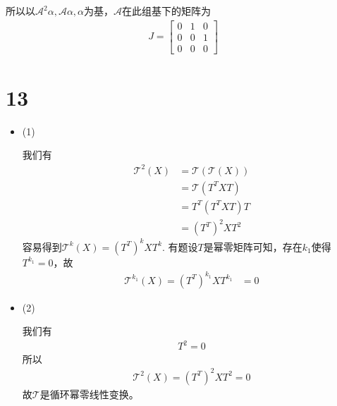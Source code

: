 \documentclass{article}
\begin{document}
所以以$\mathscr{A}^2 \alpha, \mathscr{A} \alpha, \alpha$为基，$\mathscr{A}$在此组基下的矩阵为
\begin{align*}
  J = \begin{bmatrix}
        0 & 1 & 0 \\
        0 & 0 & 1 \\
        0 & 0 & 0
      \end{bmatrix}
\end{align*}

\section*{13}

\begin{itemize}
  \item (1)

        我们有
        \begin{align*}
          \mathscr{T}^2(X)
           & = \mathscr{T}(\mathscr{T}(X)) \\
           & = \mathscr{T}(T^T X T)        \\
           & = T^T (T^T X T) T             \\
           & = (T^T)^2 X T^2
        \end{align*}
        容易得到$\mathscr{T}^k(X) = (T^T)^k X T^k$.
        有题设$T$是幂零矩阵可知，存在$k_1$使得$T^{k_1} = 0$，故
        \begin{align*}
          \mathscr{T}^{k_1}(X) = (T^T)^{k_1} X T^{k_1} & = 0
        \end{align*}
  \item (2)

        我们有
        \begin{align*}
          T^2 = 0
        \end{align*}
        所以
        \begin{align*}
          \mathscr{T}^2(X) = (T^T)^2 X T^2 = 0
        \end{align*}
        故$\mathscr{T}$是循环幂零线性变换。


\end{itemize}
\end{document}
